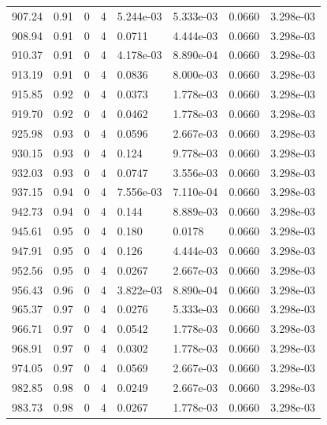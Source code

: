 \documentclass[preview]{standalone}
\begin{document}
{{{{{{\begin{tabular}{L{1.2cm}C{1.2cm} C{0.3cm}C{0.5cm} C{1.4cm}C{1.4cm} C{1.4cm}C{1.4cm}}
  907.24  &  0.91  & 0     &  4 &  5.244e-03  & 5.333e-03  & 0.0660 &  3.298e-03   \\ 
  908.94  &  0.91  & 0     &  4 &  0.0711  & 4.444e-03  & 0.0660 &  3.298e-03   \\ 
  910.37  &  0.91  & 0     &  4 &  4.178e-03  & 8.890e-04  & 0.0660 &  3.298e-03   \\ 
  913.19  &  0.91  & 0     &  4 &  0.0836  & 8.000e-03  & 0.0660 &  3.298e-03   \\ 
  915.85  &  0.92  & 0     &  4 &  0.0373  & 1.778e-03  & 0.0660 &  3.298e-03   \\ 
  919.70  &  0.92  & 0     &  4 &  0.0462  & 1.778e-03  & 0.0660 &  3.298e-03   \\ 
  925.98  &  0.93  & 0     &  4 &  0.0596  & 2.667e-03  & 0.0660 &  3.298e-03   \\ 
  930.15  &  0.93  & 0     &  4 &  0.124  & 9.778e-03  & 0.0660 &  3.298e-03   \\ 
  932.03  &  0.93  & 0     &  4 &  0.0747  & 3.556e-03  & 0.0660 &  3.298e-03   \\ 
  937.15  &  0.94  & 0     &  4 &  7.556e-03  & 7.110e-04  & 0.0660 &  3.298e-03   \\ 
  942.73  &  0.94  & 0     &  4 &  0.144  & 8.889e-03  & 0.0660 &  3.298e-03   \\ 
  945.61  &  0.95  & 0     &  4 &  0.180  & 0.0178  & 0.0660 &  3.298e-03   \\ 
  947.91  &  0.95  & 0     &  4 &  0.126  & 4.444e-03  & 0.0660 &  3.298e-03   \\ 
  952.56  &  0.95  & 0     &  4 &  0.0267  & 2.667e-03  & 0.0660 &  3.298e-03   \\ 
  956.43  &  0.96  & 0     &  4 &  3.822e-03  & 8.890e-04  & 0.0660 &  3.298e-03   \\ 
  965.37  &  0.97  & 0     &  4 &  0.0276  & 5.333e-03  & 0.0660 &  3.298e-03   \\ 
  966.71  &  0.97  & 0     &  4 &  0.0542  & 1.778e-03  & 0.0660 &  3.298e-03   \\ 
  968.91  &  0.97  & 0     &  4 &  0.0302  & 1.778e-03  & 0.0660 &  3.298e-03   \\ 
  974.05  &  0.97  & 0     &  4 &  0.0569  & 2.667e-03  & 0.0660 &  3.298e-03   \\ 
  982.85  &  0.98  & 0     &  4 &  0.0249  & 2.667e-03  & 0.0660 &  3.298e-03   \\ 
  983.73  &  0.98  & 0     &  4 &  0.0267  & 1.778e-03  & 0.0660 &  3.298e-03   \\ 

\end{tabular}}}}}}}
\end{document}
